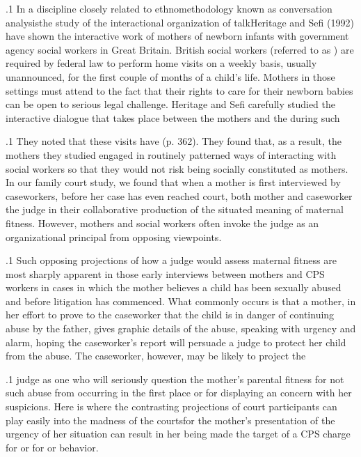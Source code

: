 \documentclass[11pt, twoside]{article}
\begin{document}
{\p.1{%
In a discipline closely related to ethnomethodology known as conversation analysis\mdash{}the study of the interactional organization of
talk\mdash{}Heritage and Sefi (1992) have shown the interactive work of mothers
of newborn infants with government agency social workers in Great
Britain. British social workers (referred to as ) are required by federal law to perform home visits on a weekly basis, usually
unannounced, for the first couple of months of a child’s life. Mothers in
those settings must attend to the fact that their rights to care for their
newborn babies can be open to serious legal challenge. Heritage and Sefi
carefully studied the interactive dialogue that takes place between the
mothers and the  during such 
}%

\p.1{%
They noted that these visits have  (p. 362). They
found that, as a result, the mothers they studied engaged in routinely
patterned ways of interacting with social workers so that they would
not risk being socially constituted as  mothers.
In our family court study, we found that when a mother is first interviewed by caseworkers, before her case has even reached court, both
mother and caseworker  the judge in their collaborative production of the situated meaning of maternal fitness. However, mothers
and social workers often invoke the judge as an organizational principal
from opposing viewpoints.
}%

\p.1{%
Such opposing projections of how a judge would assess maternal
fitness are most sharply apparent in those early interviews between
mothers and CPS workers in cases in which the mother believes a child
has been sexually abused and before litigation has commenced. What
commonly occurs is that a mother, in her effort to prove to the caseworker that the child is in danger of continuing abuse by the father,
gives graphic details of the abuse, speaking with urgency and alarm,
hoping the caseworker’s report will persuade a judge to protect her child
from the abuse. The caseworker, however, may be likely to project the
}%

\p.1{%
judge as one who will seriously question the mother’s parental fitness
for not  such abuse from occurring in the first place or for
displaying an  concern with her suspicions. Here is where
the contrasting projections of court participants can play easily into the
madness of the courts\mdash{}for the mother’s presentation of the urgency of her
situation can result in her being made the target of a CPS 
charge for  or for 
or  behavior.
}%


}
\end{document}
